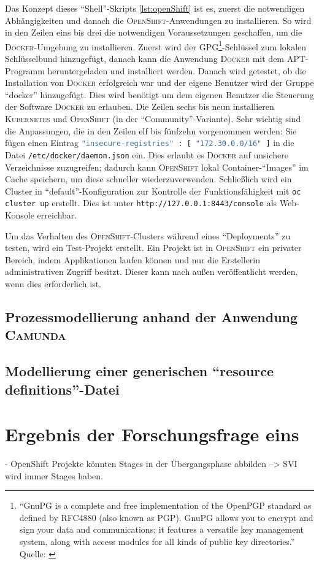 Das Konzept dieses \enquote{Shell}-Skripts \vref{lst:openShift} ist es, zuerst die notwendigen Abhängigkeiten und danach die \textsc{OpenShift}-Anwendungen zu installieren. So wird in den Zeilen eins bis drei die notwendigen Voraussetzungen geschaffen, um die \textsc{Docker}-Umgebung zu installieren. Zuerst wird der \textsc{GPG}\footnote{\enquote{GnuPG is a complete and free implementation of the OpenPGP standard as defined by RFC4880 (also known as PGP). GnuPG allows you to encrypt and sign your data and communications; it features a versatile key management system, along with access modules for all kinds of public key directories.} Quelle: \cite{the_people_of_the_gnupg_project_gnu_2020}}-Schlüssel zum lokalen Schlüsselbund hinzugefügt, danach kann die Anwendung \textsc{Docker} mit dem \ac{APT}-Programm heruntergeladen und installiert werden. Danach wird getestet, ob die Installation von \textsc{Docker} erfolgreich war und der eigene Benutzer wird der Gruppe \enquote{docker} hinzugefügt. Dies wird benötigt um dem eigenen Benutzer die Steuerung der Software \textsc{Docker} zu erlauben. Die Zeilen sechs bis neun installieren \textsc{Kubernetes} und \textsc{OpenShift} (in der \enquote{Community}-Variante). Sehr wichtig sind die Anpassungen, die in den Zeilen elf bis fünfzehn vorgenommen werden: Sie fügen einen Eintrag \lstinline[language=bash]|"insecure-registries" : [ "172.30.0.0/16" ]| in die Datei \lstinline[language=bash]|/etc/docker/daemon.json| ein. Dies erlaubt es \textsc{Docker} auf unsichere Verzeichnisse zuzugreifen; dadurch kann \textsc{OpenShift} lokal Container-\enquote{Images} im Cache speichern, um diese schneller wiederzuverwenden. Schließlich wird ein Cluster in \enquote{default}-Konfiguration zur Kontrolle der Funktionsfähigkeit mit \lstinline[language=bash]|oc cluster up| erstellt. Dies ist unter \lstinline[language=HTML, breaklines=true]|http://127.0.0.1:8443/console| als Web-Konsole erreichbar.
\par
Um das Verhalten des \textsc{OpenShift}-Clusters während eines \enquote{Deployments} zu testen, wird ein Test-Projekt erstellt. Ein Projekt ist in \textsc{OpenShift} ein privater Bereich, indem Applikationen laufen können und nur die Erstellerin administrativen Zugriff besitzt. Dieser kann nach außen veröffentlicht werden, wenn dies erforderlich ist. 

\subsection{Prozessmodellierung anhand der Anwendung \textsc{Camunda}}
\subsection{Modellierung einer generischen \enquote{resource definitions}-Datei}

\section{Ergebnis der Forschungsfrage eins}
- OpenShift Projekte könnten Stages in der Übergangsphase abbilden --> SVI wird immer Stages haben.